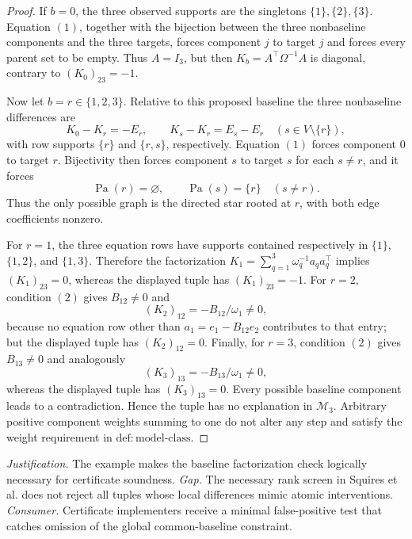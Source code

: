 \documentclass{article}
\begin{document}
\begin{proof}
If \(b=0\), the three observed supports are the singletons
\(\{1\},\{2\},\{3\}\).  Equation \((1)\), together with the bijection between
the three nonbaseline components and the three targets, forces component
\(j\) to target \(j\) and forces every parent set to be empty.  Thus
\(A=I_3\), but then \(K_b=A^{\top}\Omega^{-1}A\) is diagonal, contrary to
\((K_0)_{23}=-1\).

Now let \(b=r\in\{1,2,3\}\).  Relative to this proposed baseline the three
nonbaseline differences are
\[
 K_0-K_r=-E_r,
 \qquad K_s-K_r=E_s-E_r\quad(s\in V\setminus\{r\}),
\]
with row supports \(\{r\}\) and \(\{r,s\}\), respectively.  Equation \((1)\)
forces component \(0\) to target \(r\).  Bijectivity then forces component
\(s\) to target \(s\) for each \(s\neq r\), and it forces
\[
 \operatorname{Pa}(r)=\varnothing,
 \qquad \operatorname{Pa}(s)=\{r\}\quad(s\neq r).
 \tag{2}
\]
Thus the only possible graph is the directed star rooted at \(r\), with both
edge coefficients nonzero.

For \(r=1\), the three equation rows have supports contained respectively in
\(\{1\}\), \(\{1,2\}\), and \(\{1,3\}\).  Therefore the factorization
\(K_1=\sum_{q=1}^3\omega_q^{-1}a_qa_q^{\top}\) implies
\((K_1)_{23}=0\), whereas the displayed tuple has \((K_1)_{23}=-1\).
For \(r=2\), condition \((2)\) gives \(B_{12}\neq0\) and
\[
 (K_2)_{12}=-B_{12}/\omega_1\neq0,
\]
because no equation row other than
\(a_1=e_1-B_{12}e_2\) contributes to that entry; but the displayed tuple has
\((K_2)_{12}=0\).  Finally, for \(r=3\), condition \((2)\) gives
\(B_{13}\neq0\) and analogously
\[
 (K_3)_{13}=-B_{13}/\omega_1\neq0,
\]
whereas the displayed tuple has \((K_3)_{13}=0\).  Every possible baseline
component leads to a contradiction.  Hence the tuple has no explanation in
\(\mathcal M_3\).  Arbitrary positive component weights summing to one do not
alter any step and satisfy the weight requirement in
\(\mathrm{def:model\mbox{-}class}\).
\end{proof}
\par\smallskip\noindent \textit{Justification.} The example makes the baseline factorization check logically necessary for certificate soundness. \textit{Gap.} The necessary rank screen in Squires et al. does not reject all tuples whose local differences mimic atomic interventions. \textit{Consumer.} Certificate implementers receive a minimal false-positive test that catches omission of the global common-baseline constraint.
\end{document}
